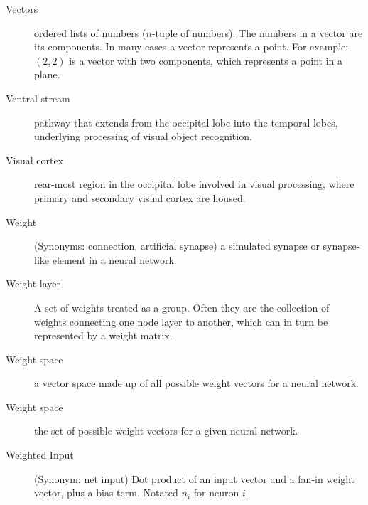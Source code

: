 \begin{description}
\item[Vectors] ordered lists of numbers ($n$-tuple of numbers). The numbers in a vector are its components. In many cases a vector represents a point. For example: $(2,2)$ is a vector with two components, which represents a point in a plane.
\item[Ventral stream] pathway that extends from the occipital lobe into the temporal lobes, underlying processing of visual object recognition. 
\item[Visual cortex] rear-most region in the occipital lobe involved in visual processing, where primary and secondary visual cortex are housed.
\item[Weight] (Synonyms: connection, artificial synapse) a simulated synapse or synapse-like element in a neural network. 
\item[Weight layer] A set of weights treated as a group. Often they are the collection of weights connecting one node layer to another, which can in turn be represented by a weight matrix.
\item[Weight space] a vector space made up of all possible weight vectors for a neural network.
\item[Weight space] the set of possible weight vectors for a given neural network.
\item[Weighted Input] (Synonym: net input)  Dot product of an input vector and a fan-in weight vector, plus a bias term. Notated $n_i$ for neuron $i$.
\end{description}